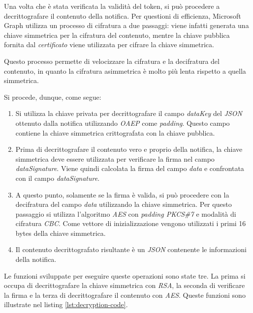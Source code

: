 \bigskip

Una volta che è stata verificata la validità del token, si può procedere a decrittografare il contenuto della notifica.
Per questioni di efficienza, Microsoft Graph utilizza un processo di cifratura a due passaggi: viene infatti generata una chiave simmetrica per la cifratura del contenuto, mentre la chiave pubblica fornita dal \emph{certificato} viene utilizzata per cifrare la chiave simmetrica.

Questo processo permette di velocizzare la cifratura e la decifratura del contenuto, in quanto la cifratura asimmetrica è molto più lenta rispetto a quella simmetrica.

\noindent Si procede, dunque, come segue:
\begin{enumerate}
	\item Si utilizza la chiave privata per decrittografare il campo \emph{dataKey} del \emph{JSON} ottenuto dalla notifica utilizzando \emph{\gls{OAEP}} come \emph{padding}. Questo campo contiene la chiave simmetrica crittografata con la chiave pubblica.
	\item Prima di decrittografare il contenuto vero e proprio della notifica, la chiave simmetrica deve essere utilizzata per verificare la firma nel campo \emph{dataSignature}.
	Viene quindi calcolata la firma del campo \emph{data} e confrontata con il campo \emph{dataSignature}.
	\item A questo punto, solamente se la firma è valida, si può procedere con la decifratura del campo \emph{data} utilizzando la chiave simmetrica.
	Per questo passaggio si utilizza l'algoritmo \emph{AES} con \emph{padding PKCS\#7} e modalità di cifratura \emph{\gls{CBC}}. Come vettore di inizializzazione vengono utilizzati i primi 16 bytes della chiave simmetrica. 
	\item Il contenuto decrittografato risultante è un \emph{JSON} contenente le informazioni della notifica.
\end{enumerate}

\noindent Le funzioni sviluppate per eseguire queste operazioni sono state tre. La prima si occupa di decrittografare la chiave simmetrica con \emph{RSA}, la seconda di verificare la firma e la terza di decrittografare il contenuto con \emph{AES}.
Queste funzioni sono illustrate nel listing \ref{lst:decryption-code}.

